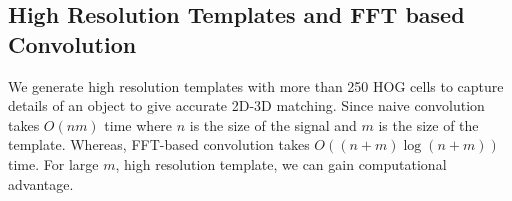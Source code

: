 \documentclass[10pt,twocolumn,letterpaper]{article}
\begin{document}

\subsection{High Resolution Templates and FFT based Convolution}
\label{sec:fft} 
We generate high resolution templates with more than 250 HOG cells to capture
details of an object to give accurate 2D-3D matching. Since naive convolution takes
$O(nm)$ time where $n$ is the size of the signal and $m$ is the size of the template.
Whereas, FFT-based convolution takes $O\left( (n + m)\log (n+m) \right)$ time. 
For large $m$, high resolution template, we can gain computational advantage.
\end{document}
